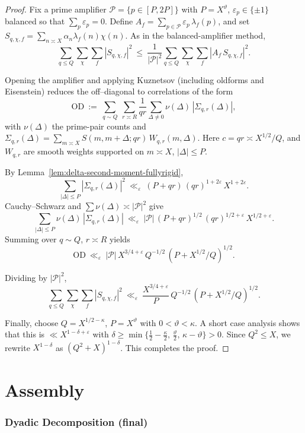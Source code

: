 \documentclass[11pt]{article}
\theoremstyle{definition}
\theoremstyle{remark}
\numberwithin{equation}{part}
\begin{document}
\begin{proof}
	Fix a prime amplifier $\mathcal P=\{p\in[P,2P]\}$ with $P=X^\vartheta$, $\varepsilon_p\in\{\pm1\}$ balanced so that $\sum_p\varepsilon_p=0$.
	Define $A_f=\sum_{p\in\mathcal P}\varepsilon_p\,\lambda_f(p)$, and set
	$S_{q,\chi,f}=\sum_{n\asymp X}\alpha_n\lambda_f(n)\chi(n)$.
	As in the balanced-amplifier method,
	\[
		\sum_{q\le Q}\sum_{\chi}\sum_f |S_{q,\chi,f}|^2
		\ \le\ \frac{1}{|\mathcal P|^2}\sum_{q\le Q}\sum_{\chi}\sum_f |A_f\,S_{q,\chi,f}|^2.
	\]

	Opening the amplifier and applying Kuznetsov (including oldforms and Eisenstein) reduces the off--diagonal to correlations of the form
	\[
		\mathrm{OD}\ :=\ \sum_{q\sim Q}\ \sum_{r\asymp R}\frac{1}{qr}\sum_{\Delta\ne0}\nu(\Delta)\,|\Sigma_{q,r}(\Delta)|,
	\]
	with $\nu(\Delta)$ the prime-pair counts and
	$\Sigma_{q,r}(\Delta)=\sum_{m\asymp X} S(m,m+\Delta;qr)\,W_{q,r}(m,\Delta)$.
	Here $c=qr\asymp X^{1/2}/Q$, and $W_{q,r}$ are smooth weights supported on $m\asymp X$, $|\Delta|\le P$.

	By Lemma~\ref{lem:delta-second-moment-fullyrigid},
	\[
		\sum_{|\Delta|\le P}|\Sigma_{q,r}(\Delta)|^2
		\ \ll_\varepsilon\ (P+qr)\,(qr)^{1+2\varepsilon}\,X^{1+2\varepsilon}.
	\]
	Cauchy--Schwarz and $\sum\nu(\Delta)\asymp |\mathcal P|^2$ give
	\[
		\sum_{|\Delta|\le P}\nu(\Delta)\,|\Sigma_{q,r}(\Delta)|
		\ \ll_\varepsilon\
		|\mathcal P|\,(P+qr)^{1/2}\,(qr)^{1/2+\varepsilon}\,X^{1/2+\varepsilon}.
	\]
	Summing over $q\sim Q$, $r\asymp R$ yields
	\[
		\mathrm{OD}\ \ll_\varepsilon\
		|\mathcal P|\,X^{3/4+\varepsilon}\,Q^{-1/2}\,(P+X^{1/2}/Q)^{1/2}.
	\]

	Dividing by $|\mathcal P|^2$,
	\[
		\sum_{q\le Q}\sum_{\chi}\sum_f |S_{q,\chi,f}|^2
		\ \ll_\varepsilon\ \frac{X^{3/4+\varepsilon}}{P}\,Q^{-1/2}\,(P+X^{1/2}/Q)^{1/2}.
	\]

	Finally, choose $Q=X^{1/2-\kappa}$, $P=X^\vartheta$ with $0<\vartheta<\kappa$.
	A short case analysis shows that this is $\ll X^{1-\delta+\varepsilon}$ with $\delta\ge\min\{\tfrac12-\tfrac{\kappa}{2},\,\tfrac{\vartheta}{2},\,\kappa-\vartheta\}>0$.
	Since $Q^2\le X$, we rewrite $X^{1-\delta}$ as $(Q^2+X)^{1-\delta}$.
	This completes the proof.
\end{proof}



\part{Assembly}
\section{Dyadic Decomposition (final)}
\end{document}

